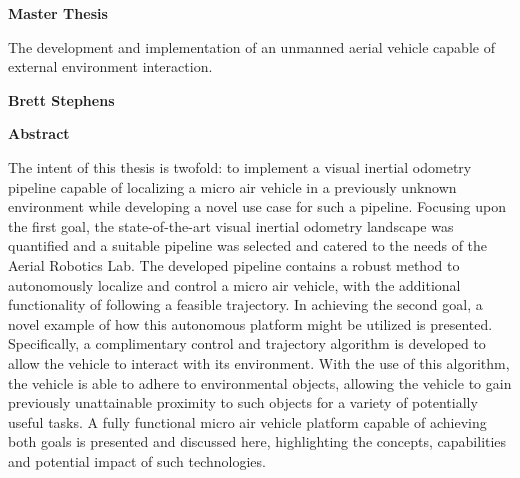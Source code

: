 \thispagestyle{plain}
\begin{center}
    \Large
    \textbf{Master Thesis}
    
    \vspace{0.4cm}
    \large
    The development and implementation of an unmanned aerial vehicle capable of external environment interaction.
    
    \vspace{0.4cm}
    \textbf{Brett Stephens}
    
    \vspace{0.9cm}
    \textbf{Abstract}
    
\end{center}

The intent of this thesis is twofold: to implement a visual inertial odometry pipeline capable of localizing a micro air vehicle in a previously unknown environment while developing a novel use case for such a pipeline. Focusing upon the first goal, the state-of-the-art visual inertial odometry landscape was quantified and a suitable pipeline was selected and catered to the needs of the Aerial Robotics Lab. The developed pipeline contains a robust method to autonomously localize and control a micro air vehicle, with the additional functionality of following a feasible trajectory. In achieving the second goal, a novel example of how this autonomous platform might be utilized is presented. Specifically, a complimentary control and trajectory algorithm is developed to allow the vehicle to interact with its environment. With the use of this algorithm, the vehicle is able to adhere to environmental objects, allowing the vehicle to gain previously unattainable proximity to such objects for a variety of potentially useful tasks. A fully functional micro air vehicle platform capable of achieving both goals is presented and discussed here, highlighting the concepts, capabilities and potential impact of such technologies. 